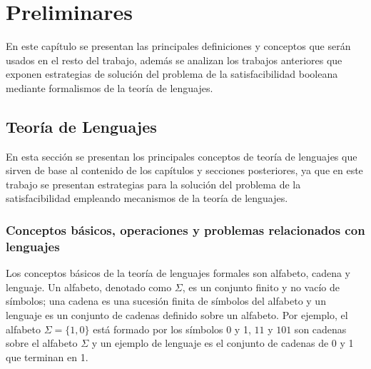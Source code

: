 \chapter{Preliminares}
\label{chap:preliminaries}




En este capítulo se presentan las principales definiciones y conceptos que serán usados en el resto del trabajo, además
se analizan los trabajos anteriores que exponen estrategias de solución del problema de la satisfacibilidad
booleana  mediante formalismos de la teoría de lenguajes.

\section{Teoría de Lenguajes}

En esta sección se presentan los principales conceptos de teoría de lenguajes que sirven de base al contenido de los 
capítulos y secciones posteriores, ya que en este trabajo se presentan estrategias para la solución del problema
de la satisfacibilidad empleando mecanismos de la teoría de lenguajes.

\subsection{Conceptos básicos, operaciones y problemas relacionados con lenguajes}

Los conceptos básicos de la teoría de lenguajes formales son alfabeto, cadena y lenguaje. Un alfabeto, denotado 
como $\Sigma$, es un conjunto finito y no vacío de símbolos; una cadena es una sucesión finita de símbolos del alfabeto y 
un lenguaje es un conjunto de cadenas definido sobre un alfabeto. Por ejemplo, el 
alfabeto $\Sigma=\{1,0\}$ está formado por los símbolos 0 y 1, $11$ y $101$ son cadenas sobre el alfabeto $\Sigma$ y un ejemplo de lenguaje
es  el conjunto de cadenas de 0 y 1 que terminan en 1.

